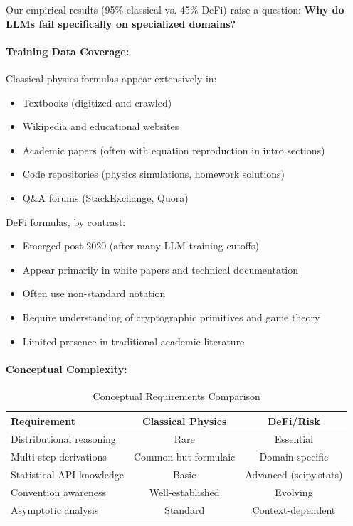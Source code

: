 Our empirical results (95\% classical vs. 45\% DeFi) raise a question: \textbf{Why do LLMs fail specifically on specialized domains?}

\paragraph{Training Data Coverage:}

Classical physics formulas appear extensively in:
\begin{itemize}
\item Textbooks (digitized and crawled)
\item Wikipedia and educational websites
\item Academic papers (often with equation reproduction in intro sections)
\item Code repositories (physics simulations, homework solutions)
\item Q\&A forums (StackExchange, Quora)
\end{itemize}

DeFi formulas, by contrast:
\begin{itemize}
\item Emerged post-2020 (after many LLM training cutoffs)
\item Appear primarily in white papers and technical documentation
\item Often use non-standard notation
\item Require understanding of cryptographic primitives and game theory
\item Limited presence in traditional academic literature
\end{itemize}

\paragraph{Conceptual Complexity:}

\begin{table}[H]
\centering
\caption{Conceptual Requirements Comparison}
\label{tab:conceptual_complexity}
\begin{tabular}{@{}lcc@{}}
\toprule
\textbf{Requirement} & \textbf{Classical Physics} & \textbf{DeFi/Risk} \\
\midrule
Distributional reasoning & Rare & Essential \\
Multi-step derivations & Common but formulaic & Domain-specific \\
Statistical API knowledge & Basic & Advanced (scipy.stats) \\
Convention awareness & Well-established & Evolving \\
Asymptotic analysis & Standard & Context-dependent \\
\bottomrule
\end{tabular}
\end{table}

